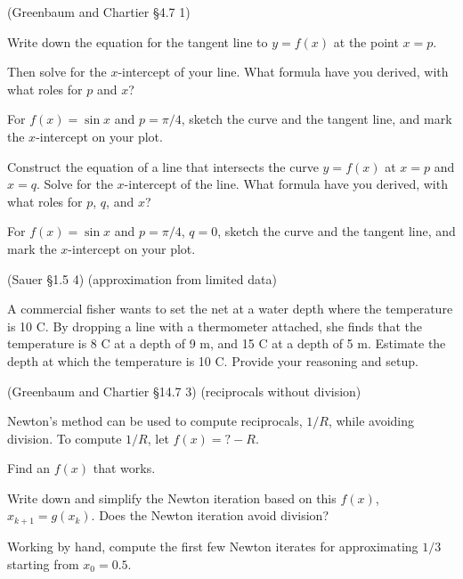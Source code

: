 \documentclass[12pt,letterpaper,noanswers]{exam}
\begin{document}
\begin{questions}
\item (Greenbaum and Chartier \S 4.7 1)

\begin{parts}
\item Write down the equation for the tangent line to $y = f(x)$ at the point $x = p$.

Then solve for the $x$-intercept of your line.  What formula have you derived, with what roles for $p$ and $x$?

For $f(x) = \sin x$ and $p = \pi/4$, sketch the curve and the tangent line, and mark the $x$-intercept on your plot.

\item Construct the equation of a line that intersects the curve $y = f(x)$ at $x = p$ and $x = q$.  Solve for the $x$-intercept of the line.  What formula have you derived, with what roles for $p$, $q$, and $x$?

For $f(x) = \sin x$ and $p = \pi/4$, $q=0$, sketch the curve and the tangent line, and mark the $x$-intercept on your plot.

\end{parts}

\item (Sauer \S1.5 4) (approximation from limited data)

A commercial fisher wants to set the net at a water depth where the temperature is 10 C. By dropping a line with a thermometer attached, she finds that the temperature is 8 C at a depth of 9 m, and 15 C at a depth of 5 m. Estimate the depth at which the temperature is 10 C.  Provide your reasoning and setup.

\item  (Greenbaum and Chartier \S14.7 3) (reciprocals without division)

Newton's method can be used to compute reciprocals, $1/R$, while avoiding division.  To compute $1/R$, let $f(x) = ? -R$.  

\begin{parts}
\item Find an $f(x)$ that works.
\item Write down and simplify the Newton iteration based on this $f(x)$, $x_{k+1} = g(x_k)$.  Does the Newton iteration avoid division?

\item Working by hand, compute the first few Newton iterates for approximating $1/3$ starting from $x_0 = 0.5$.


\end{parts}
\end{questions}
\end{document}

